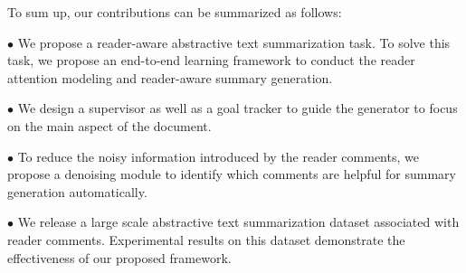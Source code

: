 \documentclass[letterpaper]{article}
\begin{document}
To sum up, our contributions can be summarized as follows:

$\bullet$ We propose a reader-aware abstractive text summarization task. To solve this task, we propose an end-to-end learning framework to conduct the reader attention modeling and reader-aware summary generation.

$\bullet$ %
We design a supervisor as well as a goal tracker to guide the generator to focus on the main aspect of the document.

$\bullet$ To reduce the noisy information introduced by the reader comments, we propose a denoising module to identify which comments are helpful for summary generation automatically.

$\bullet$ We release a large scale abstractive text summarization dataset associated with reader comments.
Experimental results on this dataset demonstrate the effectiveness of our proposed framework.
\end{document}
